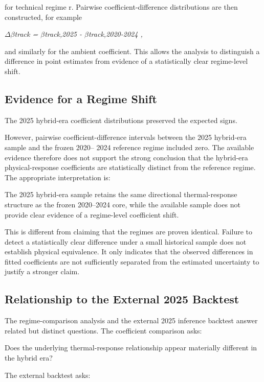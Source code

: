 for technical regime r. Pairwise coefficient-difference distributions are then constructed, for example

\begin{center}\textit{\ensuremath{\Delta}\ensuremath{\beta}track = \ensuremath{\beta}track,2025 - \ensuremath{\beta}track,2020-2024 ,}\end{center}

and similarly for the ambient coefficient. This allows the analysis to distinguish a difference in point estimates from evidence of a statistically clear regime-level shift.

\subsection{Evidence for a Regime Shift}
The 2025 hybrid-era coefficient distributions preserved the expected signs.

However, pairwise coefficient-difference intervals between the 2025 hybrid-era sample and the frozen 2020-- 2024 reference regime included zero. The available evidence therefore does not support the strong conclusion that the hybrid-era physical-response coefficients are statistically distinct from the reference regime. The appropriate interpretation is:

The 2025 hybrid-era sample retains the same directional thermal-response structure as the frozen 2020--2024 core, while the available sample does not provide clear evidence of a regime-level coefficient shift.

This is different from claiming that the regimes are proven identical. Failure to detect a statistically clear difference under a small historical sample does not establish physical equivalence. It only indicates that the observed differences in fitted coefficients are not sufficiently separated from the estimated uncertainty to justify a stronger claim.

\subsection{Relationship to the External 2025 Backtest}
The regime-comparison analysis and the external 2025 inference backtest answer related but distinct questions. The coefficient comparison asks:

Does the underlying thermal-response relationship appear materially different in the hybrid era?

The external backtest asks:


